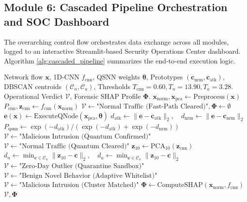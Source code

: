 \documentclass[preprint,12pt]{elsarticle}
\begin{document}
\subsection{Module 6: Cascaded Pipeline Orchestration and SOC Dashboard}
The overarching control flow orchestrates data exchange across all modules, logged to an interactive Streamlit-based Security Operations Center dashboard. Algorithm \ref{alg:cascaded_pipeline} summarizes the end-to-end execution logic.

\begin{algorithm}[t]
\caption{End-to-End Cascaded Intrusion Detection and Triage}
\label{alg:cascaded_pipeline}
\begin{algorithmic}[1]
\Require Network flow $\mathbf{x}$, 1D-CNN $f_{\text{cnn}}$, QSNN weights $\boldsymbol{\theta}$, Prototypes $(\mathbf{c}_{\text{nrm}}, \mathbf{c}_{\text{atk}})$, DBSCAN centroids $(\mathcal{C}_n, \mathcal{C}_a)$, Thresholds $T_{\text{cnn}}=0.60, T_n=13.90, T_a=3.28$.
\Ensure Operational Verdict $\mathcal{V}$, Forensic SHAP Profile $\boldsymbol{\Phi}$.
\State $\mathbf{x}_{\text{norm}}, \mathbf{x}_{\text{pca}} \gets \text{Preprocess}(\mathbf{x})$
\State $P_{\text{cnn}}, \mathbf{z}_{\text{cnn}} \gets f_{\text{cnn}}(\mathbf{x}_{\text{norm}})$ 
    \State \Return $\mathcal{V} \gets \text{"Normal Traffic (Fast-Path Cleared)"}, \boldsymbol{\Phi} \gets \emptyset$
\EndIf
\State $\mathbf{e}(\mathbf{x}) \gets \text{ExecuteQNode}(\mathbf{x}_{\text{pca}}, \boldsymbol{\theta})$ 
\State $d_{\text{atk}} \gets \|\mathbf{e} - \mathbf{c}_{\text{atk}}\|_2, \quad d_{\text{nrm}} \gets \|\mathbf{e} - \mathbf{c}_{\text{nrm}}\|_2$
\State $P_{\text{qsnn}} \gets \exp(-d_{\text{atk}}) / (\exp(-d_{\text{atk}}) + \exp(-d_{\text{nrm}}))$
    \State $\mathcal{V} \gets \text{"Malicious Intrusion (Quantum Confirmed)"}$
    \State $\mathcal{V} \gets \text{"Normal Traffic (Quantum Cleared)"}$
\Else \Comment{Stage 4: DBSCAN Triage for $P_{\text{qsnn}} \in [0.45, 0.60)$}
    \State $\mathbf{z}_{10} \gets \text{PCA}_{10}(\mathbf{z}_{\text{cnn}})$
    \State $d_n \gets \min_{\mathbf{c} \in \mathcal{C}_n} \|\mathbf{z}_{10} - \mathbf{c}\|_2, \quad d_a \gets \min_{\mathbf{c} \in \mathcal{C}_a} \|\mathbf{z}_{10} - \mathbf{c}\|_2$
        \State $\mathcal{V} \gets \text{"Zero-Day Outlier (Quarantine Sandbox)"}$
        \State $\mathcal{V} \gets \text{"Benign Novel Behavior (Adaptive Whitelist)"}$
    \Else
        \State $\mathcal{V} \gets \text{"Malicious Intrusion (Cluster Matched)"}$
    \EndIf
\EndIf
\State $\boldsymbol{\Phi} \gets \text{ComputeSHAP}(\mathbf{x}_{\text{norm}}, f_{\text{cnn}})$ 
\State \Return $\mathcal{V}, \boldsymbol{\Phi}$
\end{algorithmic}
\end{algorithm}
\end{document}

